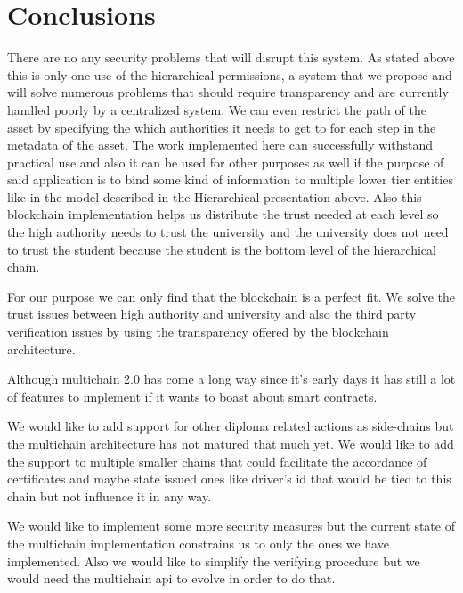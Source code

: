 \documentclass[conference]{IEEEtran}
\begin{document}
\section{Conclusions}
There are no any security problems that will disrupt this system. As stated above this is only one use of the hierarchical permissions, a system that we propose and will solve numerous problems that should require transparency and are currently  handled poorly by a centralized system. We can even restrict the path of the asset by specifying the which authorities it needs to get to for each step in the metadata of the asset.
The work implemented here can successfully withstand practical use and also it can be used for other purposes as well if the purpose of said application is to bind some kind of information to multiple lower tier entities like in the model described in the Hierarchical presentation above. Also this blockchain implementation helps us distribute the trust needed at each level so the high authority needs to trust the university and the university does not need to trust the student because the student is the bottom level of the hierarchical chain.


For our purpose we can only find that the blockchain is a perfect fit. We solve the trust issues between high authority and university and also the third party verification issues by using the transparency offered by the blockchain architecture.


Although multichain 2.0 has come a long way since it's early days it has still a lot of features to implement if it wants to boast about smart contracts.

We would like to add support for other diploma related actions as side-chains but the multichain architecture has not matured that much yet.
We would like to add the support to multiple smaller chains that could facilitate the accordance of certificates and maybe state issued ones like driver's id that would be tied to this chain but not influence it in any way.\par
We would like to implement some more security measures but the current state of the multichain implementation constrains us to only the ones we have implemented. Also we would like to simplify the verifying procedure but we would need the multichain api to evolve in order to do that.\par



\end{document}
